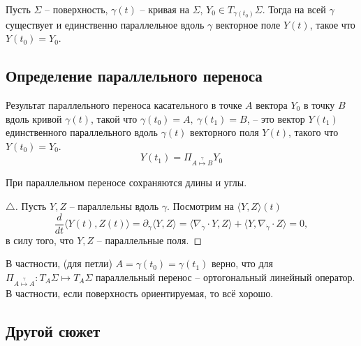 \begin{to_thr} 
    Пусть $\Sigma$ -- поверхность, $\gamma(t)$ -- кривая на $\Sigma$, $Y_0 \in T_{\gamma(t_0)} \Sigma$. Тогда на всей $\gamma$ существует и единственно параллельное вдоль $\gamma$ векторное поле $Y(t)$, такое что $Y(t_0) = Y_0$.
\end{to_thr}

\subsection{Определение параллельного переноса}


\begin{to_def} 
    Результат параллельного переноса касательного в точке $A$ вектора $Y_0$ в точку $B$ вдоль кривой $\gamma(t)$, такой что $\gamma(t_0)=A, \ \gamma(t_1) = B$, -- это вектор $Y(t_1)$ единственного параллельного вдоль $\gamma(t)$ векторного поля $Y(t)$, такого что $Y(t_0)=Y_0$.
\begin{equation*}
    Y(t_1) = \Pi_{A \overset{\gamma}{\mapsto}  B}  Y_0
\end{equation*}
\end{to_def}

\begin{to_lem} 
    При параллельном переносе сохраняются длины и углы. 
\end{to_lem}

\begin{proof}[$\triangle$]
    
Пусть $Y, Z$ -- параллельны вдоль $\gamma$. Посмотрим на $\langle Y, Z \rangle (t)$
\begin{equation*}
    \frac{d }{d t} \langle Y(t), Z(t) \rangle =
    \partial_{\dot{\gamma}} \langle Y, Z\rangle
    = 
    \langle \nabla_{\dot{\gamma}} \cdot Y, Z\rangle +
    \langle Y, \nabla_{ \dot{\gamma}} \cdot Z \rangle = 0,
\end{equation*}
в силу того, что $Y, Z$ -- параллельные поля.
\end{proof}

В частности, (для петли) $A = \gamma(t_0) = \gamma(t_1)$ верно, что для $\Pi_{A \overset{\gamma}{\mapsto}  A} \colon T_A \Sigma \mapsto T_A \Sigma$ параллельный перенос -- ортогональный линейный оператор. В частности, если поверхность ориентируемая, то всё хорошо. 


\subsection{Другой сюжет}

